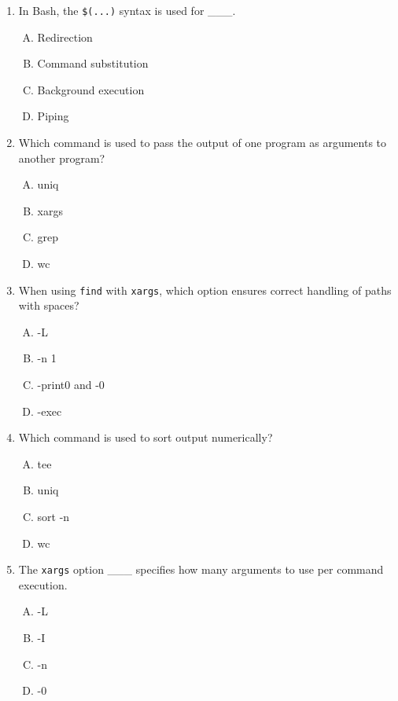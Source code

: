 \documentclass[a4paper]{report}
\begin{document}
\begin{enumerate}[1.]
    \item In Bash, the \texttt{\$(...)} syntax is used for \_\_\_.  
    \begin{enumerate}[A)]
        \item Redirection  
        \item Command substitution  
        \item Background execution  
        \item Piping  
    \end{enumerate}

    \item Which command is used to pass the output of one program as arguments to another program?  
    \begin{enumerate}[A)]
        \item uniq  
        \item xargs  
        \item grep  
        \item wc  
    \end{enumerate}

    \item When using \texttt{find} with \texttt{xargs}, which option ensures correct handling of paths with spaces?  
    \begin{enumerate}[A)]
        \item -L  
        \item -n 1  
        \item -print0 and -0  
        \item -exec  
    \end{enumerate}

    \item Which command is used to sort output numerically?  
    \begin{enumerate}[A)]
        \item tee  
        \item uniq  
        \item sort -n  
        \item wc  
    \end{enumerate}

    \item The \texttt{xargs} option \_\_\_ specifies how many arguments to use per command execution.  
    \begin{enumerate}[A)]
        \item -L  
        \item -I  
        \item -n  
        \item -0  
    \end{enumerate}


\end{enumerate}
\end{document}
